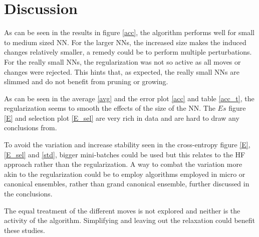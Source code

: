 \chapter{Discussion}

As can be seen in the results in figure \ref{acc}, the algorithm performs well for small to medium sized NN. For the larger NNs, the increased size makes the induced changes relatively smaller, a remedy could be to perform multiple perturbations. For the really small NNs, the regularization was not so active as all moves or changes were rejected. This hints that, as expected, the really small NNs are slimmed and do not benefit from pruning or growing. 

As can be seen in the average \ref{avg} and the error plot \ref{acc} and table \ref{acc_t}, the regularization seems to smooth the effects of the size of the NN. The $Es$ figure \ref{E} and selection plot \ref{E_sel} are very rich in data and are hard to draw any conclusions from. 

To avoid the variation and increase stability seen in the cross-entropy figure \ref{E}, \ref{E_sel} and \ref{std}, bigger mini-batches could be used but this relates to the HF approach rather than the regularization. A way to combat the variation more akin to the regularization could be to employ algorithms employed in micro or canonical ensembles, rather than grand canonical ensemble, further discussed in the conclusions.

The equal treatment of the different moves is not explored and neither is the activity of the algorithm. Simplifying and leaving out the relaxation could benefit these studies. 